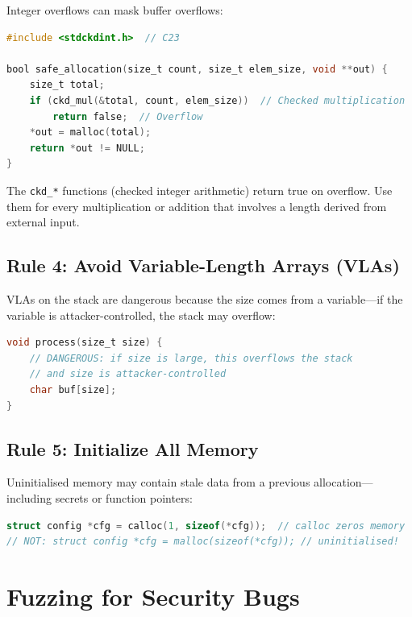 Integer overflows can mask buffer overflows:

\begin{lstlisting}[language=C, caption=Safe integer arithmetic]
#include <stdckdint.h>  // C23

bool safe_allocation(size_t count, size_t elem_size, void **out) {
    size_t total;
    if (ckd_mul(&total, count, elem_size))  // Checked multiplication
        return false;  // Overflow
    *out = malloc(total);
    return *out != NULL;
}
\end{lstlisting}

The \texttt{ckd\_*} functions (checked integer arithmetic) return true on overflow. Use them for every multiplication or addition that involves a length derived from external input.

\subsection{Rule 4: Avoid Variable-Length Arrays (VLAs)}

VLAs on the stack are dangerous because the size comes from a variable---if the variable is attacker-controlled, the stack may overflow:

\begin{lstlisting}[language=C, caption=Never use VLAs with untrusted sizes]
void process(size_t size) {
    // DANGEROUS: if size is large, this overflows the stack
    // and size is attacker-controlled
    char buf[size];
}
\end{lstlisting}

\subsection{Rule 5: Initialize All Memory}

Uninitialised memory may contain stale data from a previous allocation---including secrets or function pointers:

\begin{lstlisting}[language=C, caption=Zero-initialise allocated memory]
struct config *cfg = calloc(1, sizeof(*cfg));  // calloc zeros memory
// NOT: struct config *cfg = malloc(sizeof(*cfg)); // uninitialised!
\end{lstlisting}

\section{Fuzzing for Security Bugs}

